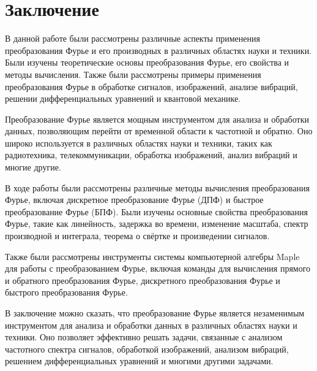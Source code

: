 
\section{Заключение}
В данной работе были рассмотрены различные аспекты применения преобразования Фурье и его производных в различных областях науки и техники. Были изучены теоретические основы преобразования Фурье, его свойства и методы вычисления. Также были рассмотрены примеры применения преобразования Фурье в обработке сигналов, изображений, анализе вибраций, решении дифференциальных уравнений и квантовой механике.

Преобразование Фурье является мощным инструментом для анализа и обработки данных, позволяющим перейти от временной области к частотной и обратно. Оно широко используется в различных областях науки и техники, таких как радиотехника, телекоммуникации, обработка изображений, анализ вибраций и многие другие.

В ходе работы были рассмотрены различные методы вычисления преобразования Фурье, включая дискретное преобразование Фурье (ДПФ) и быстрое преобразование Фурье (БПФ). Были изучены основные свойства преобразования Фурье, такие как линейность, задержка во времени, изменение масштаба, спектр производной и интеграла, теорема о свёртке и произведении сигналов.

Также были рассмотрены инструменты системы компьютерной алгебры Maple для работы с преобразованием Фурье, включая команды для вычисления прямого и обратного преобразования Фурье, дискретного преобразования Фурье и быстрого преобразования Фурье.

В заключение можно сказать, что преобразование Фурье является незаменимым инструментом для анализа и обработки данных в различных областях науки и техники. Оно позволяет эффективно решать задачи, связанные с анализом частотного спектра сигналов, обработкой изображений, анализом вибраций, решением дифференциальных уравнений и многими другими задачами.
